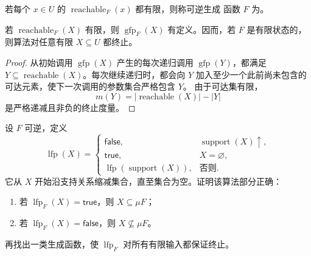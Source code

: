 \begin{definition}
\label{def:21.5.11}
若每个 \(x\in U\) 的 \(\operatorname{reachable}_F(x)\) 都有限，则称可逆生成
函数 \(F\) 为。
\end{definition}

\begin{theorem}
\label{thm:21.5.12}
若 \(\operatorname{reachable}_F(X)\) 有限，则 \(\operatorname{gfp}_F(X)\)
有定义。因而，若 \(F\) 是有限状态的，则算法对任意有限 \(X\subseteq U\) 都终止。
\end{theorem}

\begin{proof}
从初始调用 \(\operatorname{gfp}(X)\) 产生的每次递归调用
\(\operatorname{gfp}(Y)\)，都满足
\(Y\subseteq\operatorname{reachable}(X)\)。每次继续递归时，都会向 \(Y\)
加入至少一个此前尚未包含的可达元素，使下一次调用的参数集合严格包含 \(Y\)。
由于可达集有限，
\[
m(Y)=|\operatorname{reachable}(X)|-|Y|
\]
是严格递减且非负的终止度量。
\end{proof}


\begin{exercise}[\(\star\star\star\)]
\label{ex:21.5.13}
设 \(F\) 可逆，定义
\[
\operatorname{lfp}(X)=
\begin{cases}
\mathsf{false},&\operatorname{support}(X)\uparrow,\\
\mathsf{true},&X=\varnothing,\\
\operatorname{lfp}(\operatorname{support}(X)),&\text{否则}.
\end{cases}
\]
它从 \(X\) 开始沿支持关系缩减集合，直至集合为空。证明该算法部分正确：
\begin{enumerate}
  \item 若 \(\operatorname{lfp}_F(X)=\mathsf{true}\)，则 \(X\subseteq\mu F\)；
  \item 若 \(\operatorname{lfp}_F(X)=\mathsf{false}\)，则 \(X\not\subseteq\mu F\)。
\end{enumerate}
再找出一类生成函数，使 \(\operatorname{lfp}_F\) 对所有有限输入都保证终止。
\end{exercise}

